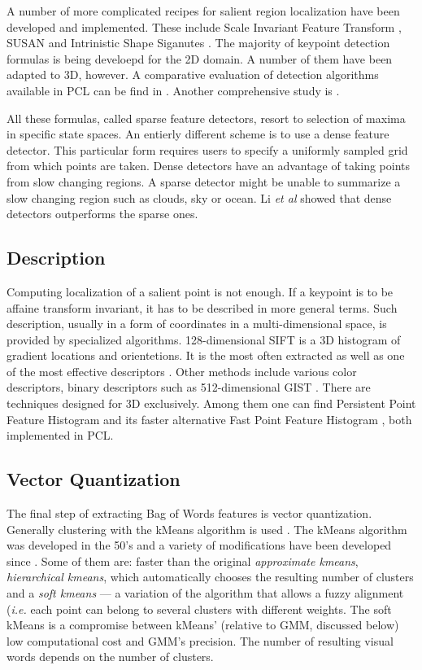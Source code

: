 \documentclass[a4paper,12pt]{article}
\begin{document}
	A number of more complicated recipes for salient region localization have been developed and implemented. These include Scale Invariant Feature Transform \cite{sift_keypoint}, SUSAN \cite{susan_keypoint} and Intrinistic Shape Siganutes \cite{iss_keypoint}. The majority of keypoint detection formulas is being develoepd for the 2D domain. A number of them have been adapted to 3D, however. A comparative evaluation of detection algorithms available in PCL can be find in \cite{pcl_keypoint_comparision}. Another comprehensive study is \cite{3d_keypoint_eval}.
	
	All these formulas, called sparse feature detectors, resort to selection of maxima in specific state spaces. An entierly different scheme is to use a dense feature detector. This particular form requires users to specify a uniformly sampled grid from which points are taken. Dense detectors have an advantage of taking points from slow changing regions. A sparse detector might be unable to summarize a slow changing region such as clouds, sky or ocean. Li \emph{et al} showed that dense detectors outperforms the sparse ones.
	
	
	
\subsection{Description}

	Computing localization of a salient point is not enough. If a keypoint is to be affaine transform invariant, it has to be described in more general terms. Such description, usually in a form of coordinates in a multi-dimensional space, is provided by specialized algorithms. 128-dimensional SIFT \cite{sift_features} is a 3D histogram of gradient locations and orientetions. It is the most often extracted as well as one of the most effective descriptors \cite{tsai2012bag}. Other methods include various color descriptors, binary descriptors such as 512-dimensional GIST \cite{ponce2011cv}. There are techniques designed for 3D exclusively. Among them one can find Persistent Point Feature Histogram \cite{pfh_rusu2008} and its faster alternative Fast Point Feature Histogram \cite{fpfh_rusu2009}, both implemented in PCL.

\subsection{Vector Quantization}

	The final step of extracting Bag of Words features is vector quantization. Generally clustering with the kMeans algorithm is used \cite{tsai2012bag}. The kMeans algorithm was developed in the 50's and a variety of modifications have been developed since \cite{kmeans_jain2010data}. Some of them are: faster than the original \emph{approximate kmeans}, \emph{hierarchical kmeans}, which automatically chooses the resulting number of clusters and a  \emph{soft kmeans} --- a variation of the algorithm that allows a fuzzy alignment (\textit{i.e.} each point can belong to several clusters with different weights. The soft kMeans is a compromise between kMeans' (relative to GMM, discussed below) low computational cost and GMM's precision. The number of resulting visual words depends on the number of clusters.
	
\end{document}
